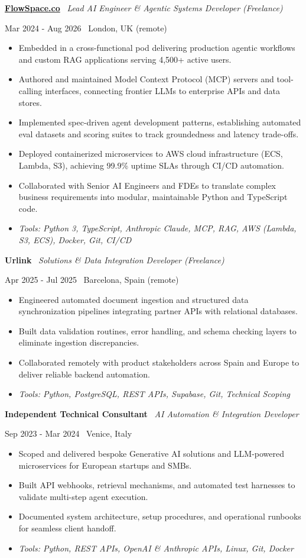 \documentclass[a4paper,10pt]{article}
\newcommand{\role}[4]{%
  \vspace{2pt}\noindent
  \begin{minipage}[t]{0.70\textwidth}\raggedright\textbf{#1} \textbullet\ \textit{#3}\end{minipage}%
  \hfill
  \begin{minipage}[t]{0.28\textwidth}\raggedleft\footnotesize\color{gray}#2 \textbullet\ #4\end{minipage}%
  \vspace{1pt}%
}
\begin{document}
\role{\href{https://flowspace.co}{FlowSpace.co}}{Mar 2024 - Aug 2026}{Lead AI Engineer \& Agentic Systems Developer (Freelance)}{London, UK (remote)}
\begin{itemize}
  \item Embedded in a cross-functional pod delivering production agentic workflows and custom RAG applications serving 4,500+ active users.
  \item Authored and maintained Model Context Protocol (MCP) servers and tool-calling interfaces, connecting frontier LLMs to enterprise APIs and data stores.
  \item Implemented spec-driven agent development patterns, establishing automated eval datasets and scoring suites to track groundedness and latency trade-offs.
  \item Deployed containerized microservices to AWS cloud infrastructure (ECS, Lambda, S3), achieving 99.9\% uptime SLAs through CI/CD automation.
  \item Collaborated with Senior AI Engineers and FDEs to translate complex business requirements into modular, maintainable Python and TypeScript code.
  \item \textit{Tools: Python 3, TypeScript, Anthropic Claude, MCP, RAG, AWS (Lambda, S3, ECS), Docker, Git, CI/CD}
\end{itemize}

\role{Urlink}{Apr 2025 - Jul 2025}{Solutions \& Data Integration Developer (Freelance)}{Barcelona, Spain (remote)}
\begin{itemize}
  \item Engineered automated document ingestion and structured data synchronization pipelines integrating partner APIs with relational databases.
  \item Built data validation routines, error handling, and schema checking layers to eliminate ingestion discrepancies.
  \item Collaborated remotely with product stakeholders across Spain and Europe to deliver reliable backend automation.
  \item \textit{Tools: Python, PostgreSQL, REST APIs, Supabase, Git, Technical Scoping}
\end{itemize}

\role{Independent Technical Consultant}{Sep 2023 - Mar 2024}{AI Automation \& Integration Developer}{Venice, Italy}
\begin{itemize}
  \item Scoped and delivered bespoke Generative AI solutions and LLM-powered microservices for European startups and SMBs.
  \item Built API webhooks, retrieval mechanisms, and automated test harnesses to validate multi-step agent execution.
  \item Documented system architecture, setup procedures, and operational runbooks for seamless client handoff.
  \item \textit{Tools: Python, REST APIs, OpenAI \& Anthropic APIs, Linux, Git, Docker}
\end{itemize}
\end{document}
